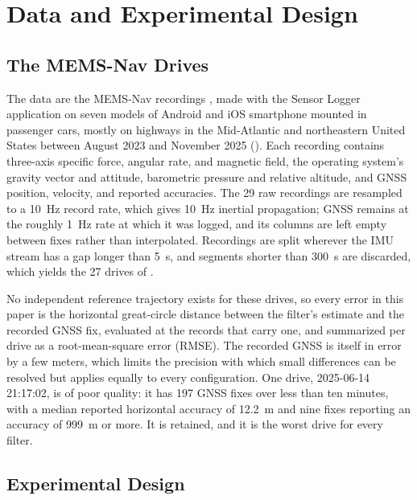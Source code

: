 \section{Data and Experimental Design}
\label{sec:experiment}

\subsection{The MEMS-Nav Drives}

The data are the MEMS-Nav recordings \citep{mems-nav-dataset}, made with the Sensor Logger application on seven models of Android and iOS smartphone mounted in passenger cars, mostly on highways in the Mid-Atlantic and northeastern United States between August 2023 and November 2025 (). Each recording contains three-axis specific force, angular rate, and magnetic field, the operating system's gravity vector and attitude, barometric pressure and relative altitude, and GNSS position, velocity, and reported accuracies. The 29 raw recordings are resampled to a 10~Hz record rate, which gives 10~Hz inertial propagation; GNSS remains at the roughly 1~Hz rate at which it was logged, and its columns are left empty between fixes rather than interpolated. Recordings are split wherever the IMU stream has a gap longer than 5~s, and segments shorter than 300~s are discarded, which yields the 27 drives of .

\begin{table}[htb]
  \caption{The 27 MEMS-Nav Drives}
  \label{tab:dataset}
  \centering
  \small
  
\end{table}

No independent reference trajectory exists for these drives, so every error in this paper is the horizontal great-circle distance between the filter's estimate and the recorded GNSS fix, evaluated at the records that carry one, and summarized per drive as a root-mean-square error (RMSE). The recorded GNSS is itself in error by a few meters, which limits the precision with which small differences can be resolved but applies equally to every configuration. One drive, 2025-06-14 21:17:02, is of poor quality: it has 197 GNSS fixes over less than ten minutes, with a median reported horizontal accuracy of 12.2~m and nine fixes reporting an accuracy of 999~m or more. It is retained, and it is the worst drive for every filter.

\subsection{Experimental Design}

